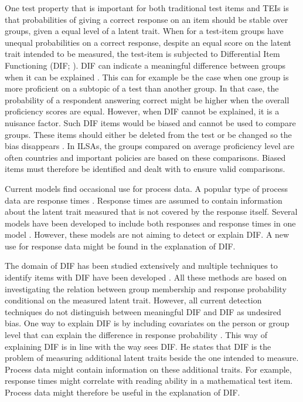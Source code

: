 \documentclass{article}
\begin{document}
One test property that is important for both traditional test items and TEIs is that probabilities of giving a correct response on an item should be stable over groups, given a equal level of a latent trait. When for a test-item groups have unequal probabilities on a correct response, despite an equal score on the latent trait intended to be measured, the test-item is subjected to Differential Item Functioning (DIF; \cite{hambleton1989detecting}). DIF can indicate a meaningful difference between groups when it can be explained \parencite{ercikan2002disentangling, kalayciouglu2011differential}. This can for example be the case when one group is more proficient on a subtopic of a test than another group. In that case, the probability of a respondent answering correct might be higher when the overall proficiency scores are equal. However, when DIF cannot be explained, it is a nuisance factor. Such DIF items would be biased and cannot be used to compare groups. These items should either be deleted from the test or be changed so the bias disappears \parencite{hagquist2019explaining}. In ILSAs, the groups compared on average proficiency level are often countries and important policies are based on these comparisons. Biased items must therefore be identified and dealt with to ensure valid comparisons.

Current models find occasional use for process data. A popular type of process data are response times \parencite{molenaar2015generalized}. Response times are assumed to contain information about the latent trait measured that is not covered by the response itself. Several models have been developed to include both responses and response times in one model \parencite{molenaar2015generalized, van2007hierarchical, entink2009statistical}. However, these models are not aiming to detect or explain DIF. A new use for response data might be found in the explanation of DIF. 

The domain of DIF has been studied extensively \parencite{zumbo1999handbook, zumbo2007three} and multiple techniques to identify items with DIF have been developed \parencite{bechger2015statistical, gao2019comparison, mellenbergh1989item}. All these methods are based on investigating the relation between group membership and response probability conditional on the measured latent trait. However, all current detection techniques do not distinguish between meaningful DIF and DIF as undesired bias. One way to explain DIF is by including covariates on the person or group level that can explain the difference in response probability \parencite{choi2014dif, hagquist2019explaining}. This way of explaining DIF is in line with the way \textcite{ackerman1992didactic} sees DIF. He states that DIF is the problem of measuring additional latent traits beside the one intended to measure. Process data might contain information on these additional traits. For example, response times might correlate with reading ability in a mathematical test item. Process data might therefore be useful in the explanation of DIF.
\end{document}
